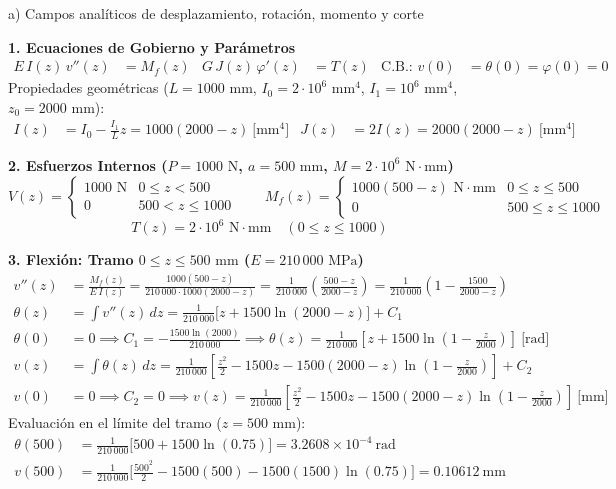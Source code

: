 
\begin{desarrollo}{a) Campos analíticos de desplazamiento, rotación, momento y corte}

\textbf{1. Ecuaciones de Gobierno y Parámetros}
\begin{align*}
    E\,I(z)\,v''(z) &= M_f(z) & G\,J(z)\,\varphi'(z) &= T(z) & \text{C.B.: } v(0) &= \theta(0) = \varphi(0) = 0
\end{align*}
Propiedades geométricas ($L=1000\text{ mm}$, $I_0=2\cdot 10^6\text{ mm}^4$, $I_1=10^6\text{ mm}^4$, $z_0 = 2000\text{ mm}$):
\begin{align*}
    I(z) &= I_0 - \frac{I_1}{L}z = 1000(2000 - z)\ \text{[mm$^4$]} & J(z) &= 2I(z) = 2000(2000 - z)\ \text{[mm$^4$]}
\end{align*}

\textbf{2. Esfuerzos Internos ($P=1000\text{ N}$, $a=500\text{ mm}$, $M=2\cdot 10^6\text{ N}\cdot\text{mm}$)}
$$V(z)=\begin{cases} 1000\text{ N} & 0\le z < 500 \\ 0 & 500 < z \le 1000 \end{cases} \qquad
M_f(z)=\begin{cases} 1000(500-z)\text{ N}\cdot\text{mm} & 0\le z\le 500 \\ 0 & 500\le z\le 1000 \end{cases}$$
$$T(z) = 2\cdot 10^6\text{ N}\cdot\text{mm} \quad (0\le z\le 1000)$$

\textbf{3. Flexión: Tramo $0 \le z \le 500\text{ mm}$ ($E = 210\,000\text{ MPa}$)}
\begin{align*}
    v''(z) &= \frac{M_f(z)}{E\,I(z)} = \frac{1000(500-z)}{210\,000 \cdot 1000(2000-z)} = \frac{1}{210\,000}\left(\frac{500-z}{2000-z}\right) = \frac{1}{210\,000}\left(1 - \frac{1500}{2000-z}\right) \\[8pt]
    \theta(z) &= \int v''(z)\,dz = \frac{1}{210\,000}\Big[z + 1500\ln(2000-z)\Big] + C_1 \\
    \theta(0) &= 0 \implies C_1 = -\frac{1500\ln(2000)}{210\,000} \implies \theta(z) = \frac{1}{210\,000}\left[z + 1500\ln\!\left(1-\frac{z}{2000}\right)\right]\ \text{[rad]} \\[8pt]
    v(z) &= \int \theta(z)\,dz = \frac{1}{210\,000}\left[\frac{z^2}{2} - 1500z - 1500(2000-z)\ln\!\left(1-\frac{z}{2000}\right)\right] + C_2 \\
    v(0) &= 0 \implies C_2 = 0 \implies v(z) = \frac{1}{210\,000}\left[\frac{z^2}{2} - 1500z - 1500(2000-z)\ln\!\left(1-\frac{z}{2000}\right)\right]\ \text{[mm]}
\end{align*}
Evaluación en el límite del tramo ($z = 500\text{ mm}$):
\begin{align*}
    \theta(500) &= \frac{1}{210\,000}\Big[500 + 1500\ln(0.75)\Big] = 3.2608\times 10^{-4}\ \text{rad} \\
    v(500) &= \frac{1}{210\,000}\Big[\frac{500^2}{2} - 1500(500) - 1500(1500)\ln(0.75)\Big] = 0.10612\ \text{mm}
\end{align*}


\end{desarrollo}
